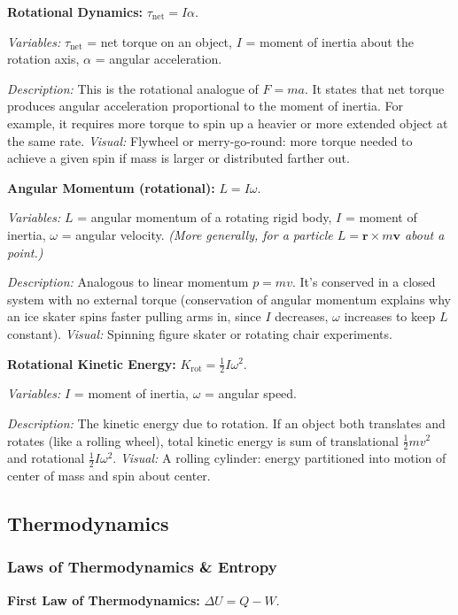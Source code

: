 \documentclass{article}
\begin{document}
\textbf{Rotational Dynamics:} $\tau_{\text{net}} = I \alpha$.

\textit{Variables:} $\tau_{\text{net}}$ = net torque on an object, $I$ = moment of inertia about the rotation axis, $\alpha$ = angular acceleration.

\textit{Description:} This is the rotational analogue of $F=ma$. It states that net torque produces angular acceleration proportional to the moment of inertia. For example, it requires more torque to spin up a heavier or more extended object at the same rate. \textit{Visual:} Flywheel or merry-go-round: more torque needed to achieve a given spin if mass is larger or distributed farther out.

\textbf{Angular Momentum (rotational):} $L = I \omega$.

\textit{Variables:} $L$ = angular momentum of a rotating rigid body, $I$ = moment of inertia, $\omega$ = angular velocity. \textit{(More generally, for a particle $L = \mathbf{r}\times m\mathbf{v}$ about a point.)}

\textit{Description:} Analogous to linear momentum $p=mv$. It’s conserved in a closed system with no external torque (conservation of angular momentum explains why an ice skater spins faster pulling arms in, since $I$ decreases, $\omega$ increases to keep $L$ constant). \textit{Visual:} Spinning figure skater or rotating chair experiments.

\textbf{Rotational Kinetic Energy:} $K_{\text{rot}} = \tfrac{1}{2} I \omega^2$.

\textit{Variables:} $I$ = moment of inertia, $\omega$ = angular speed.

\textit{Description:} The kinetic energy due to rotation. If an object both translates and rotates (like a rolling wheel), total kinetic energy is sum of translational $\frac12mv^2$ and rotational $\frac12I\omega^2$. \textit{Visual:} A rolling cylinder: energy partitioned into motion of center of mass and spin about center.

\subsection*{Thermodynamics}

\subsubsection*{Laws of Thermodynamics \& Entropy}

\textbf{First Law of Thermodynamics:} $\displaystyle \Delta U = Q - W$.
\end{document}
